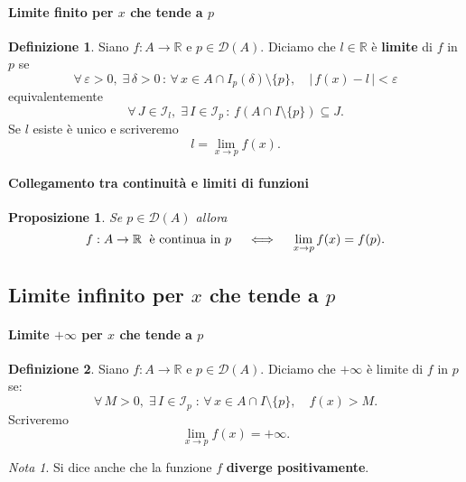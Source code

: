 \documentclass{article}
\theoremstyle{plain}
\newtheorem{prop}[thm]{Proposizione}
\theoremstyle{definition}
\newtheorem{defn}{Definizione}[section]
\theoremstyle{remark}
\newtheorem{note}{Nota}
\begin{document}
\vspace{10pt}

\paragraph{Limite finito per $x$ che tende a $p$}
\begin{bxthm}
\begin{defn}
    Siano $f:A\to\mathbb{R}$ e $p\in\mathcal{D}(A)$.
    Diciamo che $l\in\mathbb{R}$ è \textbf{limite} di $f$ in $p$ se
    \[\forall\,\varepsilon>0,\;\exists\,\delta>0\,:\,\forall\, x\in A\cap I_p(\delta)\setminus\{p\},\quad |\,f(x)-l\,|<\varepsilon\]
    equivalentemente 
    \[\forall\, J\in \mathcal{I}_l,\;\exists\, I\in \mathcal{I}_p\,:\,f(A\cap I\setminus\{p\})\subseteq J.\]
    Se $l$ esiste è unico e scriveremo 
    \[l=\lim_{x\to p} f(x).\]
\end{defn}
\end{bxthm}

\vspace{10pt}

\paragraph{Collegamento tra continuità e limiti di funzioni}
\begin{bxthm}
\begin{prop}
    Se $p\in\mathcal{D}(A)$ allora 
    \[f:A\to\mathbb{R}\;\textup{ è continua in }p\quad\iff\quad \lim_{x\to p} f(x)=f(p).\]
\end{prop}
\end{bxthm}

\vspace{20pt}

\subsection{Limite infinito per $x$ che tende a $p$}

\vspace{10pt}

\paragraph{Limite $+\infty$ per $x$ che tende a $p$}
\begin{bxthm}
\begin{defn}
    Siano $f:A\to\mathbb{R}$ e $p\in\mathcal{D}(A)$.
    Diciamo che $+\infty$ è limite di $f$ in $p$ se:
    \[\forall\, M>0,\;\exists\,I\in\mathcal{I}_{p}\;:\,\forall\, x\in A\cap I\setminus\{p\},\quad f(x)>M.\]
    Scriveremo 
    \[\lim_{x\to p}f(x)=+\infty.\]
\end{defn}
\end{bxthm}
\begin{note}
    Si dice anche che la funzione $f$ \textbf{diverge positivamente}.
\end{note}
\end{document}
